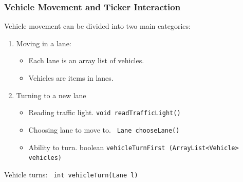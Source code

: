 \documentclass{beamer}
\begin{document}
\begin{frame}
\frametitle {Vehicle Movement and Ticker Interaction}
Vehicle movement can be divided into two main categories:
\begin{figure}
\end{figure}
\begin{enumerate}
\item Moving in a lane:
\begin{itemize}
\item Each lane is an array list of vehicles.
\item Vehicles are items in lanes.
\end{itemize}

\item Turning to a new lane
\begin{itemize}
\item Reading traffic light. \texttt {void readTrafficLight()}
\item Choosing lane to move to. \texttt{ Lane chooseLane() }
\item Ability to turn. boolean \texttt{vehicleTurnFirst (ArrayList<Vehicle> vehicles)}
\begin{figure}[h]
\end{figure}
\end{itemize}
\end{enumerate}
Vehicle turns: \texttt{ int vehicleTurn(Lane l) } 

\end{frame}
\end{document}
